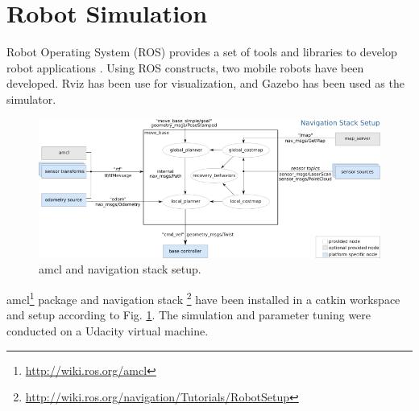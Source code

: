 \documentclass[10pt,journal,compsoc]{IEEEtran}
\begin{document}
%
%



%

\section{Robot Simulation}

Robot Operating System (ROS) provides a set of tools and libraries to develop robot applications \cite{288}. Using ROS constructs, two mobile robots have been developed.  Rviz has been use for visualization, and Gazebo has been used as the simulator. 

\begin{figure}[thpb]
      \centering
      \includegraphics[width=\linewidth]{misc/overview_tf_small.png}
      \caption{amcl and navigation stack setup.}
      \label{fig:nav_stack}
\end{figure}

amcl\footnote{\url{http://wiki.ros.org/amcl}} package and navigation stack \footnote{\url{http://wiki.ros.org/navigation/Tutorials/RobotSetup}} have been installed in a catkin workspace and setup according to Fig. \ref{fig:nav_stack}. The simulation and parameter tuning were conducted on a Udacity virtual machine.
\end{document}
